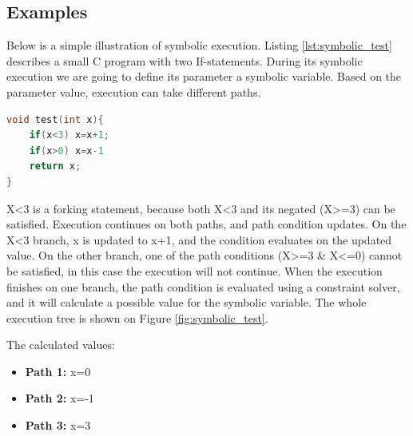 \subsection{Examples}
Below is a simple illustration of symbolic execution. Listing \ref{lst:symbolic_test} describes a small C program with two If-statements. During its symbolic execution we are going to define its parameter a symbolic variable. Based on the parameter value, execution can take different paths. 

\begin{lstlisting}[frame=single,float=!ht,caption={An example program demonstrating symbolic execution},captionpos=b,label={lst:symbolic_test},language=C++]
void test(int x){
	if(x<3) x=x+1;
	if(x>0) x=x-1
	return x;
}
\end{lstlisting}

X<3 is a forking statement, because both X<3 and its negated (X>=3) can be satisfied. Execution continues on both paths, and path condition updates. On the X<3 branch, x is updated to x+1, and the condition evaluates on the updated value. On the other branch, one of the path conditions (X>=3 \& X<=0) cannot be satisfied, in this case the execution will not continue. When the execution finishes on one branch, the path condition is evaluated using a constraint solver, and it will calculate a possible value for the symbolic variable. The whole execution tree is shown on Figure \ref{fig:symbolic_test}. \cite{Pasareanu}

The calculated values:
\begin{itemize}
\item \textbf{Path 1:} x=0
\item \textbf{Path 2:} x=-1
\item \textbf{Path 3:} x=3

\end{itemize}

